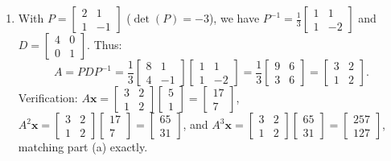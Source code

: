\documentclass[11pt, letterpaper]{article}
\theoremstyle{definition}
\theoremstyle{remark}
\begin{document}
\begin{enumerate}[label=(\alph*)]
    \item With $P = \begin{bmatrix} 2 & 1 \\ 1 & -1 \end{bmatrix}$ ($\det(P) = -3$), we have $P^{-1} = \frac{1}{3}\begin{bmatrix} 1 & 1 \\ 1 & -2 \end{bmatrix}$ and $D = \begin{bmatrix} 4 & 0 \\ 0 & 1 \end{bmatrix}$. Thus:
    \[
    A = PDP^{-1} = \frac{1}{3}\begin{bmatrix} 8 & 1 \\ 4 & -1 \end{bmatrix}\begin{bmatrix} 1 & 1 \\ 1 & -2 \end{bmatrix} = \frac{1}{3}\begin{bmatrix} 9 & 6 \\ 3 & 6 \end{bmatrix} = \begin{bmatrix} 3 & 2 \\ 1 & 2 \end{bmatrix}.
    \]
    Verification: $A\mathbf{x} = \begin{bmatrix} 3 & 2 \\ 1 & 2 \end{bmatrix}\begin{bmatrix} 5 \\ 1 \end{bmatrix} = \begin{bmatrix} 17 \\ 7 \end{bmatrix}$, $A^{2}\mathbf{x} = \begin{bmatrix} 3 & 2 \\ 1 & 2 \end{bmatrix}\begin{bmatrix} 17 \\ 7 \end{bmatrix} = \begin{bmatrix} 65 \\ 31 \end{bmatrix}$, and $A^{3}\mathbf{x} = \begin{bmatrix} 3 & 2 \\ 1 & 2 \end{bmatrix}\begin{bmatrix} 65 \\ 31 \end{bmatrix} = \begin{bmatrix} 257 \\ 127 \end{bmatrix}$, matching part (a) exactly.
\end{enumerate}
\end{document}
